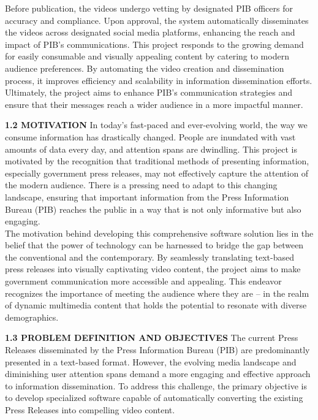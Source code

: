 \documentclass[12pt]{article}
\begin{document}
Before publication, the videos undergo vetting by designated PIB officers for accuracy and compliance. Upon approval, the system automatically disseminates the videos across designated social media platforms, enhancing the reach and impact of PIB's communications. This project responds to the growing demand for easily consumable and visually appealing content by catering to modern audience preferences. By automating the video creation and dissemination process, it improves efficiency and scalability in information dissemination efforts. Ultimately, the project aims to enhance PIB's communication strategies and ensure that their messages reach a wider audience in a more impactful manner.

\bigskip
\bigskip

\noindent \fontsize{12}{12}\textbf{1.2 MOTIVATION}
\justify      
\hspace{5mm} In today's fast-paced and ever-evolving world, the way we consume information has drastically changed. People are inundated with vast amounts of data every day, and attention spans are dwindling. This project is motivated by the recognition that traditional methods of presenting information, especially government press releases, may not effectively capture the attention of the modern audience. There is a pressing need to adapt to this changing landscape, ensuring that important information from the Press Information Bureau (PIB) reaches the public in a way that is not only informative but also engaging.\\

The motivation behind developing this comprehensive software solution lies in the belief that the power of technology can be harnessed to bridge the gap between the conventional and the contemporary. By seamlessly translating text-based press releases into visually captivating video content, the project aims to make government communication more accessible and appealing. This endeavor recognizes the importance of meeting the audience where they are – in the realm of dynamic multimedia content that holds the potential to resonate with diverse demographics.
   
\bigskip
\bigskip
\noindent  

\noindent  


\noindent \fontsize{12}{12} \textbf{1.3 PROBLEM DEFINITION AND OBJECTIVES}
\justify
\hspace{5mm} The current Press Releases disseminated by the Press Information Bureau (PIB) are predominantly presented in a text-based format. However, the evolving media landscape and diminishing user attention spans demand a more engaging and effective approach to information dissemination. To address this challenge, the primary objective is to develop specialized software capable of automatically converting the existing Press Releases into compelling video content.\\
\end{document}
